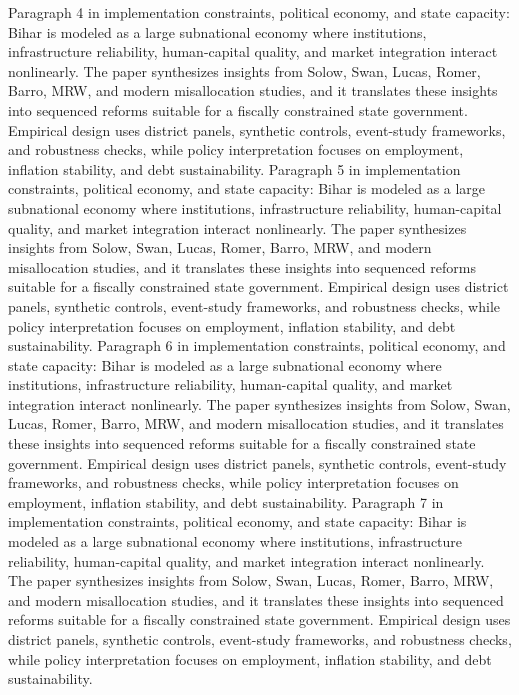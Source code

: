 \documentclass[preprint,12pt]{elsarticle}
\begin{document}
Paragraph 4 in implementation constraints, political economy, and state capacity: Bihar is modeled as a large subnational economy where institutions, infrastructure reliability, human-capital quality, and market integration interact nonlinearly. The paper synthesizes insights from Solow, Swan, Lucas, Romer, Barro, MRW, and modern misallocation studies, and it translates these insights into sequenced reforms suitable for a fiscally constrained state government. Empirical design uses district panels, synthetic controls, event-study frameworks, and robustness checks, while policy interpretation focuses on employment, inflation stability, and debt sustainability.
Paragraph 5 in implementation constraints, political economy, and state capacity: Bihar is modeled as a large subnational economy where institutions, infrastructure reliability, human-capital quality, and market integration interact nonlinearly. The paper synthesizes insights from Solow, Swan, Lucas, Romer, Barro, MRW, and modern misallocation studies, and it translates these insights into sequenced reforms suitable for a fiscally constrained state government. Empirical design uses district panels, synthetic controls, event-study frameworks, and robustness checks, while policy interpretation focuses on employment, inflation stability, and debt sustainability.
Paragraph 6 in implementation constraints, political economy, and state capacity: Bihar is modeled as a large subnational economy where institutions, infrastructure reliability, human-capital quality, and market integration interact nonlinearly. The paper synthesizes insights from Solow, Swan, Lucas, Romer, Barro, MRW, and modern misallocation studies, and it translates these insights into sequenced reforms suitable for a fiscally constrained state government. Empirical design uses district panels, synthetic controls, event-study frameworks, and robustness checks, while policy interpretation focuses on employment, inflation stability, and debt sustainability.
Paragraph 7 in implementation constraints, political economy, and state capacity: Bihar is modeled as a large subnational economy where institutions, infrastructure reliability, human-capital quality, and market integration interact nonlinearly. The paper synthesizes insights from Solow, Swan, Lucas, Romer, Barro, MRW, and modern misallocation studies, and it translates these insights into sequenced reforms suitable for a fiscally constrained state government. Empirical design uses district panels, synthetic controls, event-study frameworks, and robustness checks, while policy interpretation focuses on employment, inflation stability, and debt sustainability.
\end{document}
